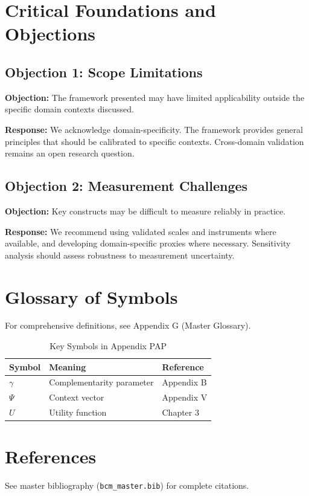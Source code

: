 
\section{Critical Foundations and Objections}
\label{sec:pap-foundations}

\subsection{Objection 1: Scope Limitations}

\textbf{Objection:} The framework presented may have limited applicability
outside the specific domain contexts discussed.

\textbf{Response:} We acknowledge domain-specificity. The framework provides
general principles that should be calibrated to specific contexts. Cross-domain
validation remains an open research question.

\subsection{Objection 2: Measurement Challenges}

\textbf{Objection:} Key constructs may be difficult to measure reliably in
practice.

\textbf{Response:} We recommend using validated scales and instruments where
available, and developing domain-specific proxies where necessary. Sensitivity
analysis should assess robustness to measurement uncertainty.



\section{Glossary of Symbols}
\label{sec:pap-glossary}

For comprehensive definitions, see Appendix G (Master Glossary).

\begin{table}[htbp]
\centering
\caption{Key Symbols in Appendix PAP}
\begin{tabular}{lll}
\toprule
\textbf{Symbol} & \textbf{Meaning} & \textbf{Reference} \\
\midrule
$\gamma$ & Complementarity parameter & Appendix B \\
$\Psi$ & Context vector & Appendix V \\
$U$ & Utility function & Chapter 3 \\
\bottomrule
\end{tabular}
\end{table}


\section{References}
\label{sec:references}

See master bibliography (\texttt{bcm\_master.bib}) for complete citations.

\nocite{bcm_master}


